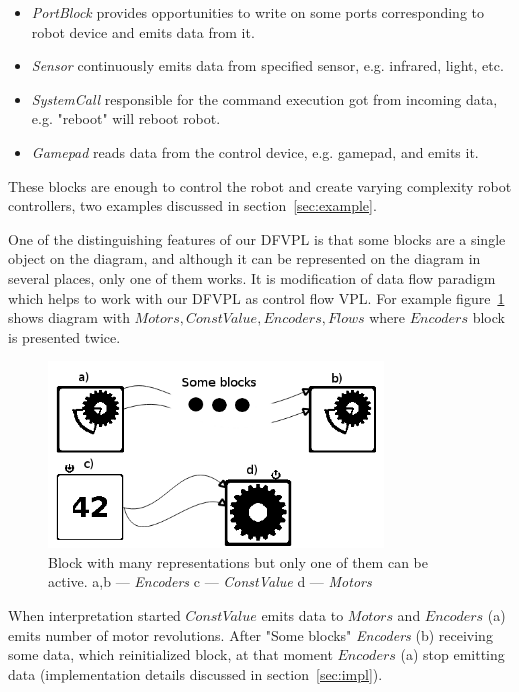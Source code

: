 \documentclass[conference,compsoc]{IEEEtran}
\begin{document}
\begin{itemize}
\begin{itemize}
\item \textit{PortBlock} provides opportunities to write on some ports corresponding to robot device and emits data from it.
\item \textit{Sensor} continuously emits data from specified sensor, e.g. infrared, light, etc.
\item \textit{SystemCall} responsible for the command execution got from incoming data, e.g. "reboot" will reboot robot.
\item \textit{Gamepad} reads data from the control device, e.g. gamepad, and emits it.
\end{itemize} 
\end{itemize} 


These blocks are enough to control the robot and create varying complexity robot controllers, two examples discussed in section~\ref{sec:example}. 

One of the distinguishing features of our DFVPL is that some blocks are a single object on the diagram, and although it can be represented on the diagram in several places, only one of them works. It is modification of data flow paradigm which helps to work with our DFVPL as control flow VPL. For example figure~\ref{image:encoder} shows diagram with $Motors, ConstValue, Encoders, Flows$ where $Encoders$ block is presented twice. 

\begin{figure}[ht]
	\centering
	\includegraphics[width=3.5in]{Encoders.png}
	\caption{Block with many representations but only one of them can be active. a,b --- \textit{Encoders} c --- \textit{ConstValue} d --- \textit{Motors}}
	\label{image:encoder}
\end{figure}

When interpretation started $ConstValue$ emits data to $Motors$ and $Encoders$ (a) emits number of motor revolutions. After "Some blocks" \textit{Encoders} (b) receiving some data, which reinitialized block, at that moment $Encoders$ (a) stop emitting data (implementation details discussed in section~\ref{sec:impl}).
\end{document}
